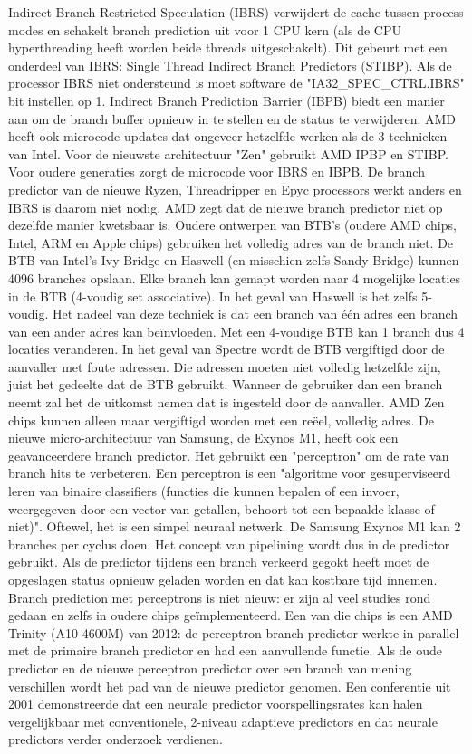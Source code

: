 Indirect Branch Restricted Speculation (IBRS) verwijdert de cache tussen process modes en schakelt branch prediction uit voor 1 CPU kern (als de CPU hyperthreading heeft worden beide threads uitgeschakelt). Dit gebeurt met een onderdeel van IBRS: Single Thread Indirect Branch Predictors (STIBP).
Als de processor IBRS niet ondersteund is moet software de "IA32_SPEC_CTRL.IBRS" bit instellen op 1.
Indirect Branch Prediction Barrier (IBPB) biedt een manier aan om de branch buffer opnieuw in te stellen en de status te verwijderen. AMD heeft ook microcode updates dat ongeveer hetzelfde werken als de 3 technieken van Intel.
Voor de nieuwste architectuur "Zen" gebruikt AMD IPBP en STIBP. Voor oudere generaties zorgt de microcode voor IBRS en IBPB. De branch predictor van de nieuwe Ryzen, Threadripper en Epyc processors werkt anders en IBRS is daarom niet nodig. AMD zegt dat de nieuwe branch predictor niet op dezelfde manier kwetsbaar is. Oudere ontwerpen van BTB's (oudere AMD chips, Intel, ARM en Apple chips) gebruiken het volledig adres van de branch niet.
De BTB van Intel's Ivy Bridge en Haswell (en misschien zelfs Sandy Bridge) kunnen 4096 branches opslaan.\parencite{Godbolt2016}
Elke branch kan gemapt worden naar 4 mogelijke locaties in de BTB (4-voudig set associative).
In het geval van Haswell is het zelfs 5-voudig.
 Het nadeel van deze techniek is dat een branch van één adres een branch van een ander adres kan beïnvloeden. Met een 4-voudige BTB kan 1 branch dus 4 locaties veranderen. In het geval van Spectre wordt de BTB vergiftigd door de aanvaller met foute adressen. Die adressen moeten niet volledig hetzelfde zijn, juist het gedeelte dat de BTB gebruikt. Wanneer de gebruiker dan een branch neemt zal het de uitkomst nemen dat is ingesteld door de aanvaller. AMD Zen chips kunnen alleen maar vergiftigd worden met een reëel, volledig adres.
De nieuwe micro-architectuur van Samsung, de Exynos M1, heeft ook een geavanceerdere branch predictor. Het gebruikt een "perceptron" om de rate van branch hits te verbeteren.
Een perceptron is een "algoritme voor gesuperviseerd leren van binaire classifiers (functies die kunnen bepalen of een invoer, weergegeven door een vector van getallen, behoort tot een bepaalde klasse of niet)".\parencite{Freund1999}
Oftewel, het is een simpel neuraal netwerk. 
De Samsung Exynos M1 kan 2 branches per cyclus doen. Het concept van pipelining wordt dus in de predictor gebruikt.
Als de predictor tijdens een branch verkeerd gegokt heeft moet de opgeslagen status opnieuw geladen worden en dat kan kostbare tijd innemen.
Branch prediction met perceptrons is niet nieuw: er zijn al veel studies rond gedaan en zelfs in oudere chips geïmplementeerd. Een van die chips is een AMD Trinity (A10-4600M) van 2012: de perceptron branch predictor werkte in parallel met de primaire branch predictor en had een aanvullende functie. 
Als de oude predictor en de nieuwe perceptron predictor over een branch van mening verschillen wordt het pad van de nieuwe predictor genomen.
Een conferentie uit 2001 demonstreerde dat een neurale predictor voorspellingsrates kan halen vergelijkbaar met conventionele, 2-niveau adaptieve predictors en dat neurale predictors verder onderzoek verdienen. \parencite{Steven2001}

